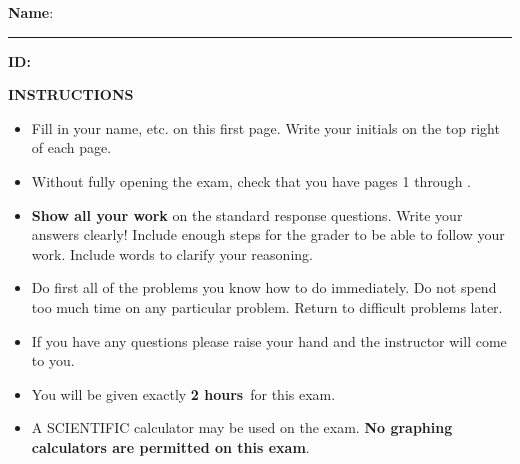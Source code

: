 \documentclass[addpoints,12pt,answers]{exam}
\newcommand{\exammin}{\textbf{2 hours}}
\begin{document}
\phantom{.}
\vspace{.2cm}

\noindent \textbf{Name}: 
\rule{.5\textwidth}{.2mm} \hspace{1cm} \textbf{ID:}
\hrulefill \\ 



\vspace{1cm}

\textbf{INSTRUCTIONS}\\[8pt]
\phantom{.}\hspace{.7cm}
\begin{minipage}{6.3in}
	\begin{itemize}
		\item Fill in your name, etc. on this first page. Write your initials on the top right of each page.
		\item Without fully opening the exam, check that you have pages 1 through \totalnumpages.
		\item {\bf Show all your work} on the standard response questions. Write your answers clearly!  Include enough steps for the grader to be able to follow your work. Include words to clarify your reasoning.
		\item Do first all of the problems you know how to do immediately. Do not spend too much time on any particular problem. Return to difficult problems later.
		\item If you have any questions please raise your hand and the instructor will come to you.
		\item You will be given exactly \exammin \ for this exam.
		\item A SCIENTIFIC calculator may be used on the exam. \textbf{No graphing calculators are permitted on this exam}.
	\end{itemize}
\end{minipage}

\vspace{.8cm}
\end{document}
